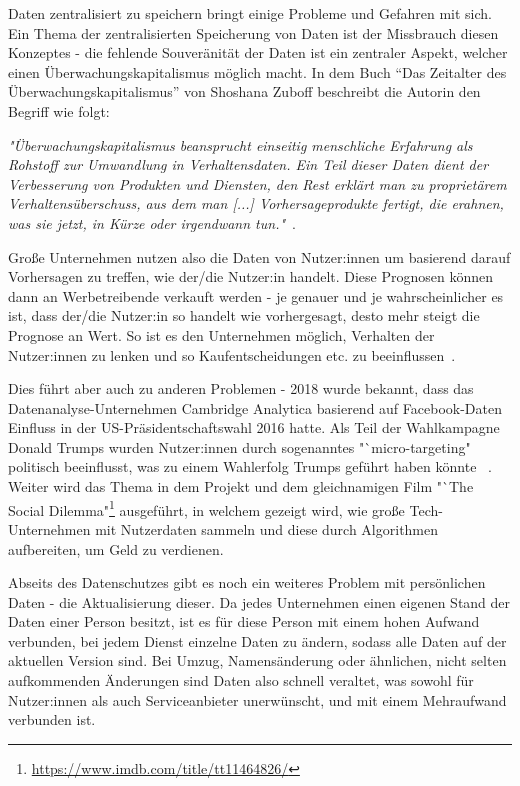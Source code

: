\documentclass[acmtog]{acmart}
\begin{document}
Daten zentralisiert zu speichern bringt einige Probleme und Gefahren mit sich. Ein Thema der zentralisierten Speicherung von Daten ist der Missbrauch diesen Konzeptes - die fehlende Souveränität der Daten ist ein zentraler Aspekt, welcher einen Überwachungskapitalismus möglich macht. In dem Buch "`Das Zeitalter des Überwachungskapitalismus"' von Shoshana Zuboff beschreibt die Autorin den Begriff wie folgt: 

\textit{"Überwachungskapitalismus beansprucht einseitig menschliche Erfahrung als Rohstoff zur Umwandlung in Verhaltensdaten. Ein Teil dieser Daten dient der Verbesserung von Produkten und Diensten, den Rest erklärt man zu proprietärem Verhaltensüberschuss, aus dem man [...] Vorhersageprodukte fertigt, die erahnen, was sie jetzt, in Kürze oder irgendwann tun."}~\cite{zuboff2018ueberwachungskapitalismus}.

Große Unternehmen nutzen also die Daten von Nutzer:innen um basierend darauf Vorhersagen zu treffen, wie der/die Nutzer:in handelt. Diese Prognosen können dann an Werbetreibende verkauft werden - je genauer und je wahrscheinlicher es ist, dass der/die Nutzer:in so handelt wie vorhergesagt, desto mehr steigt die Prognose an Wert. So ist es den Unternehmen möglich, Verhalten der Nutzer:innen zu lenken und so Kaufentscheidungen etc. zu beeinflussen~\cite{zuboff2018ueberwachungskapitalismus}.

Dies führt aber auch zu anderen Problemen - 2018 wurde bekannt, dass das Datenanalyse-Unternehmen Cambridge Analytica basierend auf Facebook-Daten Einfluss in der US-Präsidentschaftswahl 2016 hatte. Als Teil der Wahlkampagne Donald Trumps wurden Nutzer:innen durch sogenanntes "`micro-targeting" politisch beeinflusst, was zu einem Wahlerfolg Trumps geführt haben könnte ~\cite{isaak2018cambridgeanalytica}. Weiter wird das Thema in dem Projekt und dem gleichnamigen Film "`The Social Dilemma"\footnote{\url{https://www.imdb.com/title/tt11464826/}} ausgeführt, in welchem gezeigt wird, wie große Tech-Unternehmen mit Nutzerdaten sammeln und diese durch Algorithmen aufbereiten, um Geld zu verdienen.

Abseits des Datenschutzes gibt es noch ein weiteres Problem mit persönlichen Daten - die Aktualisierung dieser. Da jedes Unternehmen einen eigenen Stand der Daten einer Person besitzt, ist es für diese Person mit einem hohen Aufwand verbunden, bei jedem Dienst einzelne Daten zu ändern, sodass alle Daten auf der aktuellen Version sind. Bei Umzug, Namensänderung oder ähnlichen, nicht selten aufkommenden Änderungen sind Daten also schnell veraltet, was sowohl für Nutzer:innen als auch Serviceanbieter unerwünscht, und mit einem Mehraufwand verbunden ist.
\end{document}
